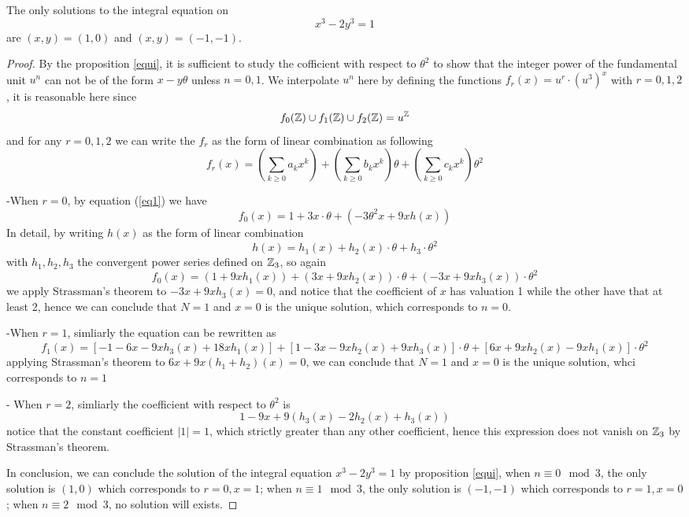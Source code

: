     \begin{theorem} \label{x3-2y3=1}
        The only solutions to the integral equation on
\[
x^{3}-2y^{3}=1
\]
are\/ $(x,y)=(1,0)$ and\/ $(x,y)=(-1,-1)$.

    \begin{proof}
        By the proposition \ref{equi}, it is sufficient to study the cofficient with respect to \(\theta^2\) to show that the integer power of the fundamental unit \(u^n\) can not be of the form \(x-y \theta\) unless \(n=0,1\). We interpolate \(u^n\) here by defining the functions \(f_r(x) = u^{r}\cdot (u^3)^x\) with \(r=0,1,2\), it is reasonable here since
        \[f_0(\mathbb{Z})\cup f_1(\mathbb{Z}) \cup f_2(\mathbb{Z}) = u^{\mathbb{Z}}\]
        and for any \(r=0,1,2\) we can write the \(f_r\) as the form of linear combination as following
         \[f_r(x) = (\sum_{k \geq 0}a_kx^k)+(\sum_{k \geq 0}b_kx^k)\theta + (\sum_{k \geq 0}c_kx^k)\theta^2\]

         -When \(r=0\), by equation (\ref{eq1}) we have
         \[f_0(x) = 1+ 3x\cdot \theta + (-3\theta^2x+9xh(x))\]
         In detail, by writing \(h(x)\) as the form of linear combination
         \[h(x) = h_1(x)+h_2(x)\cdot\theta + h_3 \cdot \theta^2\]
         with \(h_1,h_2,h_3\) the convergent power series defined on \(\mathbb{Z}_3\), so again
         \[f_0(x) = (1+9xh_1(x)) + (3x+9xh_2(x))\cdot \theta + (-3x+9xh_3(x)) \cdot \theta^2\]
         we apply Strassman's theorem to \(-3x+9xh_3(x) = 0\), and notice that the coefficient of \(x\) has valuation 1 while the other have that at least 2, hence we can conclude that \(N=1\) and \(x=0\) is the unique solution, which corresponds to \(n=0\).
         
         -When \(r=1\), simliarly the equation can be rewritten as
         \[f_1(x) = [-1-6x-9xh_3(x)+18xh_1(x)]+[1-3x-9xh_2(x)+9xh_3(x)]\cdot \theta + [6x+9xh_2(x)-9xh_1(x)]\cdot \theta^2\]
         applying Strassman's theorem to \(6x+9x(h_1+h_2)(x) = 0\), we can conclude that \(N=1\) and \(x=0\) is the unique solution, whci corresponds to \(n=1\)

         - When \(r=2\), simliarly the coefficient with respect to \(\theta^2\) is \[1-9x+9(h_3(x)-2h_2(x)+h_3(x)) \]
         notice that the constant coefficient \(|1| = 1\), which strictly greater than any other coefficient, hence this expression does not vanish on \(\mathbb{Z}_3\) by Strassman's theorem.

         In conclusion, we can conclude the solution of the integral equation \(x^3-2y^3=1\) by proposition \ref{equi}, when \(n \equiv 0 \mod 3\),  the only solution is \((1,0)\) which corresponds to \(r=0, x=1\); when \(n \equiv 1 \mod 3\), the only solution is \((-1,-1)\) which corresponds to \(r=1,x=0\); when \(n \equiv 2 \mod 3\), no solution will exists.
    \end{proof}
    \end{theorem}


   




